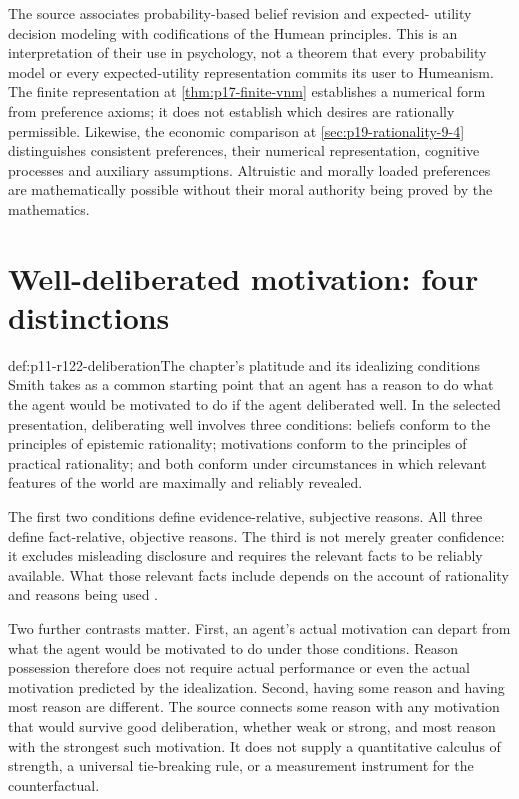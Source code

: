 The source associates probability-based belief revision and expected-
utility decision modeling with codifications of the Humean principles.
This is an interpretation of their use in psychology, not a theorem
that every probability model or every expected-utility representation
commits its user to Humeanism. The finite representation at
\cref{thm:p17-finite-vnm} establishes a numerical form from preference
axioms; it does not establish which desires are rationally permissible.
Likewise, the economic comparison at
\cref{sec:p19-rationality-9-4} distinguishes consistent preferences,
their numerical representation, cognitive processes and auxiliary
assumptions. Altruistic and morally loaded preferences are mathematically
possible without their moral authority being proved by the mathematics.

\section{Well-deliberated motivation: four distinctions}
\label{sec:p11-r122-deliberation}

\begin{hbdefinition}{def:p11-r122-deliberation}{The chapter's platitude and its idealizing conditions}
Smith takes as a common starting point that an agent has a reason to
do what the agent would be motivated to do if the agent deliberated
well. In the selected presentation, deliberating well involves three
conditions: beliefs conform to the principles of epistemic rationality;
motivations conform to the principles of practical rationality; and
both conform under circumstances in which relevant features of the
world are maximally and reliably revealed.

The first two conditions define evidence-relative, subjective reasons.
All three define fact-relative, objective reasons. The third is not
merely greater confidence: it excludes misleading disclosure and requires
the relevant facts to be reliably available. What those relevant facts
include depends on the account of rationality and reasons being used
\parencite[p.~695]{Smith2021MoralReasons}.
\end{hbdefinition}

Two further contrasts matter. First, an agent's actual motivation can
depart from what the agent would be motivated to do under those conditions.
Reason possession therefore does not require actual performance or even
the actual motivation predicted by the idealization. Second, having some
reason and having most reason are different. The source connects some
reason with any motivation that would survive good deliberation, whether
weak or strong, and most reason with the strongest such motivation.
It does not supply a quantitative calculus of strength, a universal
tie-breaking rule, or a measurement instrument for the counterfactual.

